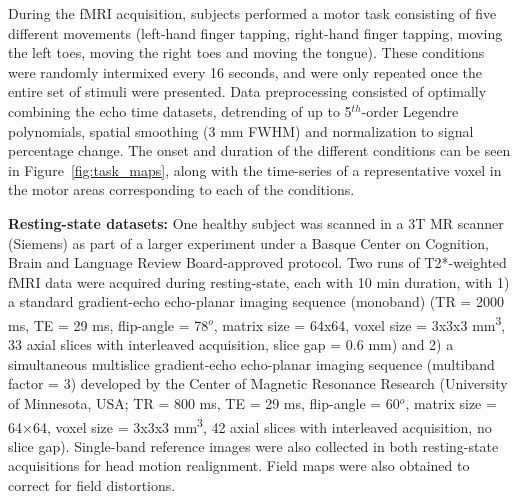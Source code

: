 During the fMRI acquisition, subjects performed a motor task consisting of five different movements (left-hand finger tapping, right-hand finger tapping, moving the left toes, moving the right toes and moving the tongue). These conditions were randomly intermixed every 16 seconds, and were only repeated once the entire set of stimuli were presented. Data preprocessing consisted of optimally combining the echo time datasets, detrending of up to 5\(^{th}\)-order Legendre polynomials, spatial smoothing (3 mm FWHM) and normalization to signal percentage change. The onset and duration of the different conditions can be seen in Figure~\ref{fig:task_maps}, along with the time-series of a representative voxel in the motor areas corresponding to each of the conditions.

\textbf{Resting-state datasets:} One healthy subject was scanned in a 3T MR scanner (Siemens) as part of a larger experiment under a Basque Center on Cognition, Brain and Language Review Board-approved protocol. Two runs of T2*-weighted fMRI data were acquired during resting-state, each with 10 min duration, with 1) a standard gradient-echo echo-planar imaging sequence (monoband) (TR = 2000 ms, TE = 29 ms, flip-angle = 78\(^o\), matrix size = 64x64, voxel size = 3x3x3 mm\textsuperscript{3}, 33 axial slices with interleaved acquisition, slice gap = 0.6 mm) and 2) a simultaneous multislice gradient-echo echo-planar imaging sequence (multiband factor = 3) developed by the Center of Magnetic Resonance Research (University of Minnesota, USA; TR = 800 ms, TE = 29 ms, flip-angle = 60\(^o\), matrix size = 64×64, voxel size = 3x3x3 mm\textsuperscript{3}, 42 axial slices with interleaved acquisition, no slice gap). Single-band reference images were also collected in both resting-state acquisitions for head motion realignment. Field maps were also obtained to correct for field distortions.

